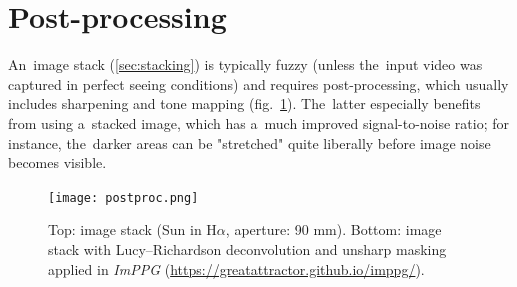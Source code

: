 \documentclass[12pt]{article}
\newcommand{\nbd}{\nobreakdash}
\begin{document}
\section{Post-processing}

An~image stack (\ref{sec:stacking}) is typically fuzzy (unless the~input video was captured in perfect seeing
conditions) and requires post\nbd-processing, which usually includes sharpening and tone mapping
(fig.~\ref{fig:postproc}). The~latter especially benefits from using a~stacked image, which has a~much improved
signal\nbd-to\nbd-noise ratio; for instance, the~darker areas can be "stretched" quite liberally before image noise
becomes visible.

\begin{figure}
\centering
\texttt{[image: postproc.png]}
\caption{Top: image stack (Sun in H$\alpha$, aperture: 90 mm). Bottom: image stack with Lucy--Richardson deconvolution and unsharp masking applied in
\emph{ImPPG} (\url{https://greatattractor.github.io/imppg/}).}
\label{fig:postproc}
\end{figure}
\end{document}
